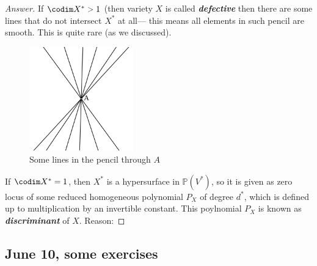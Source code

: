 \documentclass{article}
\renewcommand{\P}{\mathbb{P}}
\begin{document}
\begin{proof}[Answer]
	If $\codim X^*>1$ (then variety $X$ is called \textit{\textbf{defective}} then there are some lines that do not intersect $X^*$ at all--- this means all elements in such pencil are smooth. This is quite rare (as we discussed).
	\begin{figure}[H]
		\centering
		\includegraphics[width=0.4\textwidth]{pencil.png}
		\caption*{Some lines in the pencil through $A$}
	\end{figure}
	If $\codim X^*=1$, then $X^*$ is a hypersurface in $\P(V^*)$, so it is given as zero locus of some reduced homogeneous polynomial $P_X$ of degree $d^*$, which is defined up to multiplication by an invertible constant. This poylnomial $P_X$ is known as \textit{\textbf{discriminant}} of $X$. Reason:

\end{proof}

\subsection{June 10, some exercises}\label{ssec:June 10, some exercises}
\end{document}

